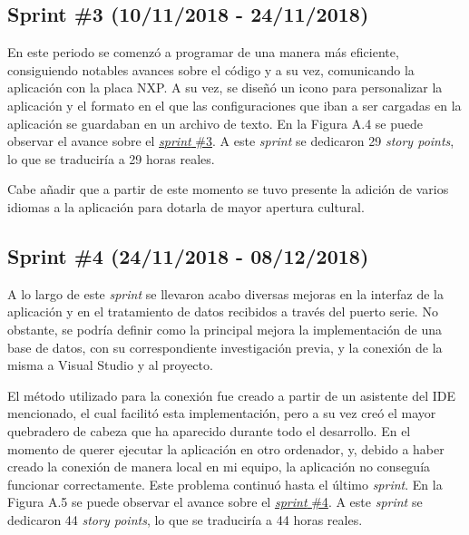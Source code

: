 \subsection{Sprint \#3 (10/11/2018 - 24/11/2018)}

En este periodo se comenzó a programar de una manera más eficiente, consiguiendo notables avances sobre el código y a su vez, comunicando la aplicación con la placa NXP. A su vez, se diseñó un icono para personalizar la aplicación y el formato en el que las configuraciones que iban a ser cargadas en la aplicación se guardaban en un archivo de texto. En la Figura A.4 se puede observar el avance sobre el \href{https://github.com/FranBurgos/TFG/milestone/4?closed=1}{\textit{sprint} \#3}. A este \textit{sprint} se dedicaron 29 \textit{story points}, lo que se traduciría a 29 horas reales.


Cabe añadir que a partir de este momento se tuvo presente la adición de varios idiomas a la aplicación para dotarla de mayor apertura cultural.

\subsection{Sprint \#4 (24/11/2018 - 08/12/2018)}

A lo largo de este \textit{sprint} se llevaron acabo diversas mejoras en la interfaz de la aplicación y en el tratamiento de datos recibidos a través del puerto serie. No obstante, se podría definir como la principal mejora la implementación de una base de datos, con su correspondiente investigación previa, y la conexión de la misma a Visual Studio y al proyecto. 

El método utilizado para la conexión fue creado a partir de un asistente del IDE mencionado, el cual facilitó esta implementación, pero a su vez creó el mayor quebradero de cabeza que ha aparecido durante todo el desarrollo. En el momento de querer ejecutar la aplicación en otro ordenador, y, debido a haber creado la conexión de manera local en mi equipo, la aplicación no conseguía funcionar correctamente. Este problema continuó hasta el último \textit{sprint}. En la Figura A.5 se puede observar el avance sobre el \href{https://github.com/FranBurgos/TFG/milestone/5?closed=1}{\textit{sprint} \#4}. A este \textit{sprint} se dedicaron 44 \textit{story points}, lo que se traduciría a 44 horas reales.


